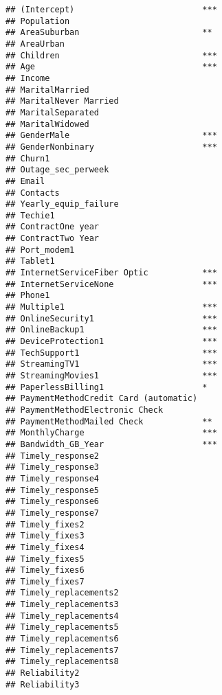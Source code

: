 \documentclass[
]{article}
\begin{document}
\begin{verbatim}
## (Intercept)                          ***
## Population                              
## AreaSuburban                         ** 
## AreaUrban                               
## Children                             ***
## Age                                  ***
## Income                                  
## MaritalMarried                          
## MaritalNever Married                    
## MaritalSeparated                        
## MaritalWidowed                          
## GenderMale                           ***
## GenderNonbinary                      ***
## Churn1                                  
## Outage_sec_perweek                      
## Email                                   
## Contacts                                
## Yearly_equip_failure                    
## Techie1                                 
## ContractOne year                        
## ContractTwo Year                        
## Port_modem1                             
## Tablet1                                 
## InternetServiceFiber Optic           ***
## InternetServiceNone                  ***
## Phone1                                  
## Multiple1                            ***
## OnlineSecurity1                      ***
## OnlineBackup1                        ***
## DeviceProtection1                    ***
## TechSupport1                         ***
## StreamingTV1                         ***
## StreamingMovies1                     ***
## PaperlessBilling1                    *  
## PaymentMethodCredit Card (automatic)    
## PaymentMethodElectronic Check           
## PaymentMethodMailed Check            ** 
## MonthlyCharge                        ***
## Bandwidth_GB_Year                    ***
## Timely_response2                        
## Timely_response3                        
## Timely_response4                        
## Timely_response5                        
## Timely_response6                        
## Timely_response7                        
## Timely_fixes2                           
## Timely_fixes3                           
## Timely_fixes4                           
## Timely_fixes5                           
## Timely_fixes6                           
## Timely_fixes7                           
## Timely_replacements2                    
## Timely_replacements3                    
## Timely_replacements4                    
## Timely_replacements5                    
## Timely_replacements6                    
## Timely_replacements7                    
## Timely_replacements8                    
## Reliability2                            
## Reliability3                            

\end{verbatim}
\end{document}
